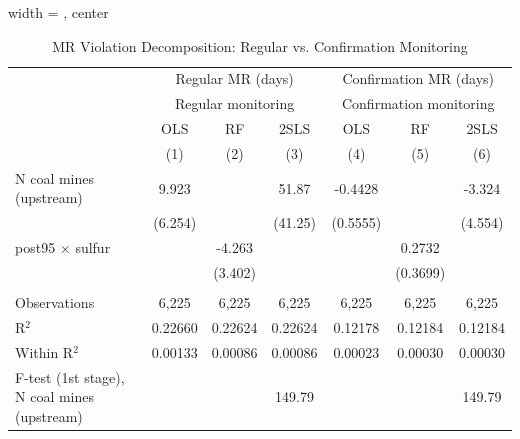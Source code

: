 
\begin{table}[htbp]
   
   \caption{\label{tab:mr_healthbased_decomp} MR Violation Decomposition: Regular vs. Confirmation Monitoring}
   \bigskip
   
   \centering
   
   \begin{adjustbox}{width = \textwidth, center}
      
      
      \begin{tabular}{lcccccc}
         \toprule
         
          & \multicolumn{3}{c}{Regular MR (days)} & \multicolumn{3}{c}{Confirmation MR (days)}\\
         
          & \multicolumn{3}{c}{Regular monitoring} & \multicolumn{3}{c}{Confirmation monitoring} \\ 
                                                     & OLS           & RF            & 2SLS          & OLS           & RF            & 2SLS  \\   
         
                                                     & (1)           & (2)           & (3)           & (4)           & (5)           & (6)\\  
         
         \midrule 
         N coal mines (upstream)                     & 9.923         &               & 51.87         & -0.4428       &               & -3.324\\   
                                                     & (6.254)       &               & (41.25)       & (0.5555)      &               & (4.554)\\   
         post95 $\times$ sulfur                      &               & -4.263        &               &               & 0.2732        &   \\   
                                                     &               & (3.402)       &               &               & (0.3699)      &   \\   
         
          \\
         
         Observations                                & 6,225         & 6,225         & 6,225         & 6,225         & 6,225         & 6,225\\  
         R$^2$                                       & 0.22660       & 0.22624       & 0.22624       & 0.12178       & 0.12184       & 0.12184\\  
         Within R$^2$                                & 0.00133       & 0.00086       & 0.00086       & 0.00023       & 0.00030       & 0.00030\\  
         F-test (1st stage), N coal mines (upstream) &               &               & 149.79        &               &               & 149.79\\  
         

\end{tabular}
\end{adjustbox}
\end{table}
